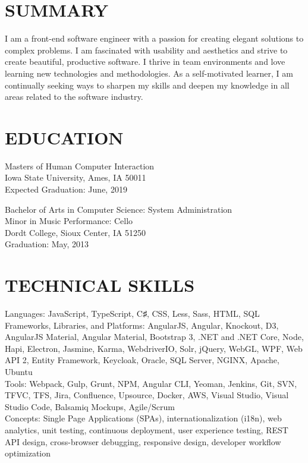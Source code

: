\documentclass{nfriend-resume}
\begin{document}
\MakeHeader
 
\begin{resume}
\section{SUMMARY} 
I am a front-end software engineer with a passion for creating elegant solutions to
complex problems. I am fascinated with usability and aesthetics and strive to
create beautiful, productive software. I thrive in team environments and love
learning new technologies and methodologies. As a self-motivated learner, I am
continually seeking ways to sharpen my skills and deepen my knowledge in all areas
related to the software industry.

\section{EDUCATION}
{\semibf Masters of Human Computer Interaction} \\
Iowa State University, Ames, IA 50011\\
Expected Graduation: June, 2019

{\semibf Bachelor of Arts} in {\semibf Computer Science: System Administration}\\
Minor in Music Performance: Cello\\
Dordt College, Sioux Center, IA 51250\\
Graduation: May, 2013

\section{TECHNICAL SKILLS}
{\semibf Languages:} JavaScript, TypeScript, C♯, CSS, Less, Sass, HTML, SQL\\[6pt]
{\semibf Frameworks, Libraries, and Platforms:} AngularJS, Angular, Knockout, D3, AngularJS
Material, Angular Material, Bootstrap 3, .NET and .NET Core, Node, Hapi, Electron,
Jasmine, Karma, WebdriverIO, Solr, jQuery, WebGL, WPF, Web API 2, Entity
Framework, Keycloak, Oracle, SQL Server, NGINX, Apache, Ubuntu\\[6pt]
{\semibf Tools:} Webpack, Gulp, Grunt, NPM, Angular CLI, Yeoman, Jenkins, Git, SVN, TFVC,
TFS, Jira, Confluence, Upsource, Docker, AWS, Visual Studio, Visual Studio Code,
Balsamiq Mockups, Agile/Scrum\\[6pt]
{\semibf Concepts:} Single Page Applications (SPAs), internationalization (i18n), web analytics,
unit testing, continuous deployment, user experience testing, REST API design,
cross-browser debugging, responsive design, developer workflow optimization


\end{resume}
\end{document}
